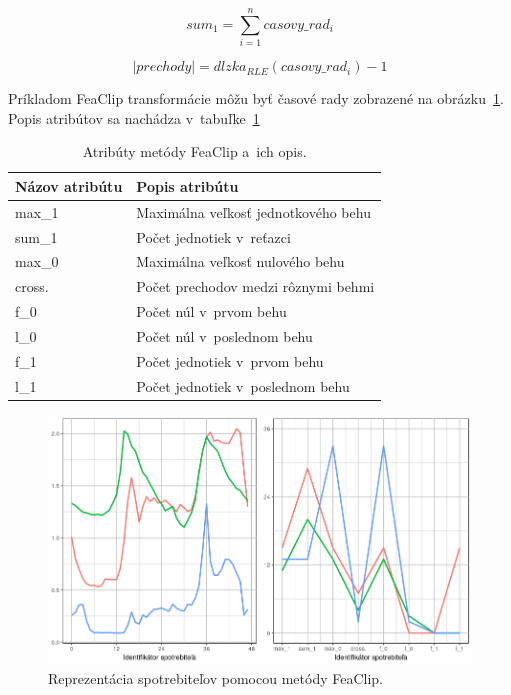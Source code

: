 \documentclass[a4paper,twoside,slovak,12pt,appendix]{article}
\begin{document}
\begin{equation}
  sum_1 = \sum_{i=1}^{n} casovy\_rad_i
  \label{eq:feaclip-sum}
\end{equation}

\begin{equation}
  |prechody| = dlzka_{RLE}(casovy\_rad_i) - 1
  \label{eq:feaclip-cross}
\end{equation}

\noindent
Príkladom FeaClip transformácie môžu byť časové rady zobrazené na
obrázku~\ref{fig:feaclip-example}. Popis atribútov sa nachádza
v~tabuľke~\ref{tab:feaclip}

\begin{table}[ht]
  \centering
  \caption{Atribúty metódy FeaClip a~ich opis.}
  \label{tab:feaclip}
  \begin{tabular}{|l|l|}
    \hline
    \textbf{Názov atribútu}   &   \textbf{Popis atribútu}  \\ \hline
    max\_1           &   Maximálna veľkosť jednotkového behu   \\ \hline
    sum\_1           &   Počet jednotiek v~reťazci             \\ \hline
    max\_0           &   Maximálna veľkosť nulového behu       \\ \hline
    cross.           &   Počet prechodov medzi rôznymi behmi   \\ \hline
    f\_0             &   Počet núl v~prvom behu                \\ \hline
    l\_0             &   Počet núl v~poslednom behu            \\ \hline
    f\_1             &   Počet jednotiek v~prvom behu          \\ \hline
    l\_1             &   Počet jednotiek v~poslednom behu      \\ \hline
  \end{tabular}
\end{table}

\begin{figure}[htbp]
  \centering
  \includegraphics[width=\textwidth]{feaclip_example.png}
  \caption{Reprezentácia spotrebiteľov pomocou metódy FeaClip.}
  \label{fig:feaclip-example}
\end{figure}
\end{document}
